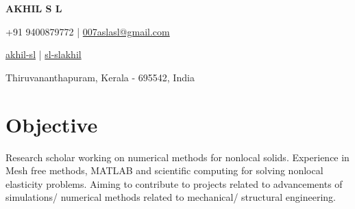 \documentclass[a4paper,11pt]{article}
\newcommand{\socialicon}[1]{\raisebox{-0.05em}{\resizebox{!}{1em}{#1}}}
\newcommand{\headerfontiii}{\fontfamily{ppl}\selectfont} %
\begin{document}
	
	\begin{center}
		{\Huge\textbf{AKHIL S L}}
	\end{center}
	\vspace{-6mm}
	
	\begin{center}
		\small{
			+91 9400879772 | \href{mailto:007aslasl@gmail.com}{007aslasl@gmail.com} 
		}
	\end{center}
	\vspace{-6mm}
	
	\begin{center}
		\small{
			\socialicon{\faLinkedin} \href{https://www.linkedin.com/in/akhil-sl-88a697b9/}{akhil-sl} | 
			\socialicon{\faGithub} \href{https://github.com/sl-slakhil}{sl-slakhil} 
		}
	\end{center}
	\vspace{-6mm}
	\begin{center}
		\small{Thiruvananthapuram, Kerala - 695542, India}
	\end{center}
%
	\section{\textbf{Objective}}
	\vspace{1mm}
	\small{
		Research scholar working on numerical methods for nonlocal solids. Experience in Mesh free methods, MATLAB and scientific computing for solving nonlocal elasticity problems. Aiming to contribute to projects related to advancements of simulations/ numerical methods related to mechanical/ structural engineering.
	}
	\vspace{-2mm}
	
	
	
\end{document}
